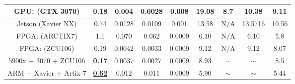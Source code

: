 \begin{table}[]
{\begin{tabular}{c|c|c|c|c|c|c|c|c}
\midrule
GPU: (GTX 3070) & 0.18 & 0.004 & 0.0028 & 0.008 & 19.08 & 8.7 & 10.38 & 9.11 \\ 
\midrule
Jetson (Xavier NX) & 0.74 & 0.0128 & 0.0109 & 0.001 & 13.58 & N/A & 13.5716 & 10.56 \\ 
\midrule
FPGA: (ARCTIX7) & 1.1 & 0.070 & 0.062 & 0.0009 & 6.10 & N/A & 6.10 & 5.8 \\ 
\midrule
FPGA: (ZCU106) & 0.19 & 0.0042 & 0.0033 & 0.0009 & 9.12 & N/A & 9.12 & 8.07 \\ 
\midrule
\rowcolor[rgb]{0.894,0.894,0.894} 5900x + 3070 + ZCU106 & \textbf{\uline{0.17}} & 0.0037 & 0.0027 & 0.0009 & 8.93 & $\sim$ & $\sim$ & 8.5 \\ 
\midrule
\rowcolor[rgb]{0.894,0.894,0.894} ARM + Xavier +   Artix-7 & \textbf{\uline{0.62}} & 0.012 & 0.011 & 0.0009 & 5.90 & $\sim$ & $\sim$ & 5.44 \\
\bottomrule
\end{tabular}
}
\end{table}
